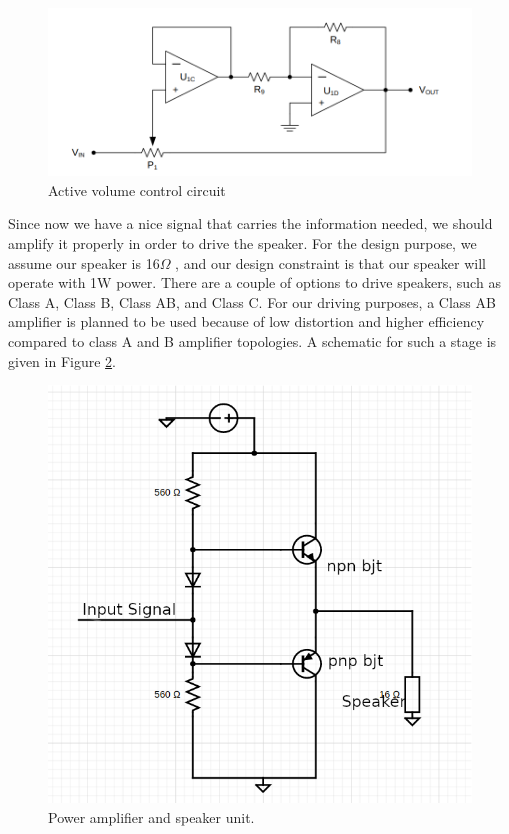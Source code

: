 \documentclass[a4paper,10pt]{IEEEtran}
\begin{document}
\begin{figure}[htbp!] %
    \centering
    \includegraphics[width = 0.75\linewidth]{baxandall_volume_control.png}
    \caption{Active volume control circuit}
    \label{Baxandall}    
\end{figure} 
Since now we have a nice signal that carries the information needed, we should amplify it properly in order to drive the speaker. For the design purpose, we assume our speaker is 16\(\Omega\) , and our design constraint is that our speaker will operate with 1W power. There are a couple of options to drive speakers, such as Class A, Class B, Class AB, and Class C. For our driving purposes, a Class AB amplifier is planned to be used because of low distortion and higher efficiency compared to class A and B amplifier topologies. A schematic for such a stage is given in Figure \ref*{power_amp_sch}.
\begin{figure}[htbp!]
    \centering
    \includegraphics[height = 0.75\linewidth]{power_amp.png}
    \caption{Power amplifier and speaker unit.}
    \label{power_amp_sch}    
\end{figure} 
\vspace{-0.5cm}
\end{document}
